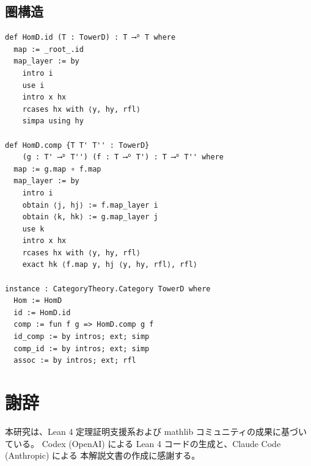 \documentclass[a4paper,12pt]{ltjsarticle}
\begin{document}
\subsection{圏構造}

\begin{verbatim}
def HomD.id (T : TowerD) : T ⟶ᴰ T where
  map := _root_.id
  map_layer := by
    intro i
    use i
    intro x hx
    rcases hx with ⟨y, hy, rfl⟩
    simpa using hy

def HomD.comp {T T' T'' : TowerD}
    (g : T' ⟶ᴰ T'') (f : T ⟶ᴰ T') : T ⟶ᴰ T'' where
  map := g.map ∘ f.map
  map_layer := by
    intro i
    obtain ⟨j, hj⟩ := f.map_layer i
    obtain ⟨k, hk⟩ := g.map_layer j
    use k
    intro x hx
    rcases hx with ⟨y, hy, rfl⟩
    exact hk ⟨f.map y, hj ⟨y, hy, rfl⟩, rfl⟩

instance : CategoryTheory.Category TowerD where
  Hom := HomD
  id := HomD.id
  comp := fun f g => HomD.comp g f
  id_comp := by intros; ext; simp
  comp_id := by intros; ext; simp
  assoc := by intros; ext; rfl
\end{verbatim}

\section{謝辞}

本研究は、Lean 4 定理証明支援系および mathlib コミュニティの成果に基づいている。
Codex (OpenAI) による Lean 4 コードの生成と、Claude Code (Anthropic) による
本解説文書の作成に感謝する。
\end{document}
